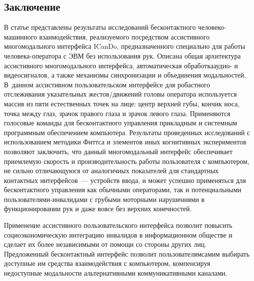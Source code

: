 \begin{multicols}{2}
\section{Заключение}

  В статье представлены результаты иссле\-до\-ваний бесконтактного 
  человеко-машинного вза\-и\-модействия, реализуемого посредством 
ассис\-тив\-но\-го многомодального интерфейса ICanDo,\linebreak
предназначенного 
специально для работы че\-ло\-ве\-ка-опе\-ра\-то\-ра с ЭВМ без использования рук. 
Опи\-сана общая архитектура ассистивного многомодального интерфейса, 
автоматическая обработка\linebreak аудио- и видеосигналов, а также механизмы 
синхронизации и объединения модальностей. В~данном ассистивном 
пользовательском интерфейсе для робастного отслеживания указательных 
жес\-тов/дви\-же\-ний головы оператора используется массив из пяти естественных 
точек на лице: центр верхней губы, кончик носа, точка между глаз, зрачок 
правого глаза и зрачок левого глаза. Применяются голосовые команды для 
бесконтактного управ\-ле\-ния прикладным и системным про\-грам\-мным 
обеспечением компьютера. Результаты проведенных исследований с 
использованием методики %
 Фиттса и элементов иных когнитивных 
экспериментов позволяют заключить, что данный многомодальный интерфейс 
обеспечивает приемлемую скорость и производительность работы пользователя 
с компьютером, не сильно отличающуюся от аналогичных показателей для 
стандартных контактных интерфейсов~--- устройств ввода, и может успешно 
применяться для бесконтактного управления как обычными операторами, так и 
потенциальными поль\-зо\-ва\-те\-ля\-ми-ин\-ва\-ли\-да\-ми с грубыми моторными 
нарушениями в функционировании рук и даже вовсе без верхних конечностей.
  
  Применение ассистивного пользовательского интерфейса позволит повысить 
социоэкономическую интеграцию инвалидов в информационном\linebreak
обществе и 
сделает их более независимыми от помощи со стороны других лиц. 
Предложенный бесконтактный интерфейс позволит пользователям\linebreak самим 
выбирать доступные им средства взаимодействия с компьютером, компенсируя 
недоступные модальности альтернативными коммуникативными каналами.

{\small\frenchspacing
{%
\begin{thebibliography}{99}


\end{thebibliography}}}
\end{multicols}
